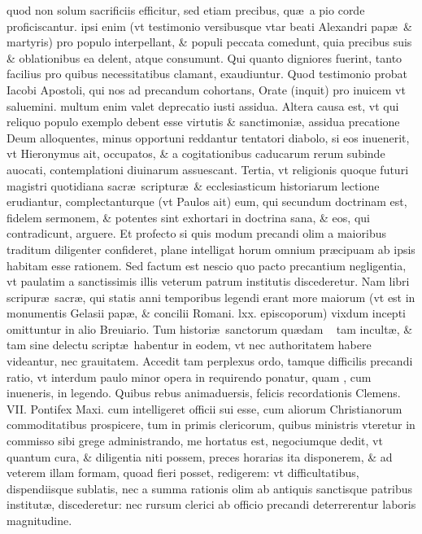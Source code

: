 \documentclass[a5paper,10pt]{book}
\def\ae{æ}
\begin{document}
quod %
non solum sacrificiis efficitur, sed etiam precibus, qu\ae \ a pio corde proficiscantur.
ipsi %
enim (vt testimonio versibusque vtar beati Alexandri pap\ae \ \& martyris) pro populo interpellant, \& populi peccata comedunt, quia precibus suis \& oblationibus ea delent, atque consumunt.
Qui quanto digniores fuerint, tanto facilius pro quibus necessitatibus clamant, exaudiuntur.
Quod testimonio probat Iacobi Apostoli, qui nos ad precandum cohortans, Orate (inquit) pro inuicem vt saluemini.
multum %
enim valet deprecatio iusti assidua.
Altera causa est, vt qui reliquo populo exemplo debent esse virtutis \& sanctimoni\ae , assidua precatione Deum alloquentes, minus opportuni reddantur tentatori diabolo, si eos inuenerit, vt Hieronymus ait, occupatos, \& a cogitationibus caducarum rerum subinde auocati, contemplationi diuinarum assuescant.
Tertia, vt religionis quoque futuri magistri quotidiana sacr\ae \ scriptur\ae \ \& ecclesiasticum historiarum lectione erudiantur, complectanturque (vt Paulos ait) eum, qui secundum doctrinam est, fidelem 
sermonem, \& potentes sint exhortari in doctrina sana, \& eos, qui contradicunt, arguere.
Et profecto si quis modum precandi olim a maioribus traditum diligenter confideret, plane intelligat horum omnium pr\ae cipuam ab ipsis habitam esse rationem.
Sed factum est nescio quo pacto precantium negligentia, vt paulatim a sanctissimis illis veterum patrum institutis discederetur.
Nam libri scripur\ae \ sacr\ae, qui statis anni temporibus legendi erant more maiorum (vt est in monumentis Gelasii pap\ae, \& concilii Romani. lxx. episcoporum) vixdum incepti omittuntur in alio Breuiario.
Tum histori\ae \ sanctorum qu\ae dam \ %
tam incult\ae , \& tam sine delectu script\ae \ habentur in eodem, vt nec authoritatem habere videantur, nec grauitatem.
Accedit tam perplexus ordo, tamque difficilis precandi ratio, vt interdum paulo minor opera in requirendo ponatur, quam%
, cum inueneris, in legendo.
Quibus rebus animaduersis, felicis recordationis Clemens. VII. Pontifex Maxi. cum intelligeret officii sui esse, cum aliorum Christianorum commoditatibus prospicere, tum in primis clericorum, quibus ministris vteretur in commisso sibi grege administrando, me hortatus est, negociumque dedit, vt quantum cura, \& diligentia niti possem, preces horarias ita disponerem, \& ad veterem illam formam, quoad fieri posset, redigerem:
vt difficultatibus, dispendiisque sublatis, nec a summa rationis olim ab antiquis sanctisque patribus institut\ae, discederetur:
nec rursum clerici ab officio precandi deterrerentur laboris magnitudine.
\end{document}
